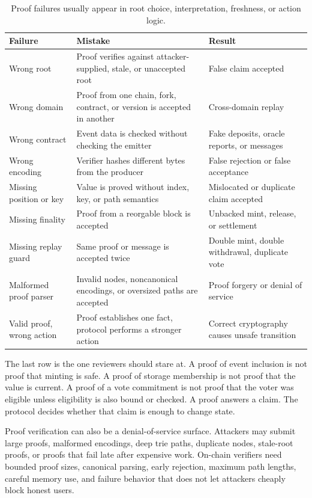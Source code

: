 \begin{table}[htbp]
\centering
\small
\renewcommand{\arraystretch}{1.18}
\begin{tabularx}{\textwidth}{@{}>{\RaggedRight\arraybackslash}p{}>{\RaggedRight\arraybackslash}p{}>{\RaggedRight\arraybackslash}X@{}}
\toprule
Failure & Mistake & Result \\
\midrule
Wrong root & Proof verifies against attacker-supplied, stale, or unaccepted root & False claim accepted \\
Wrong domain & Proof from one chain, fork, contract, or version is accepted in another & Cross-domain replay \\
Wrong contract & Event data is checked without checking the emitter & Fake deposits, oracle reports, or messages \\
Wrong encoding & Verifier hashes different bytes from the producer & False rejection or false acceptance \\
Missing position or key & Value is proved without index, key, or path semantics & Mislocated or duplicate claim accepted \\
Missing finality & Proof from a reorgable block is accepted & Unbacked mint, release, or settlement \\
Missing replay guard & Same proof or message is accepted twice & Double mint, double withdrawal, duplicate vote \\
Malformed proof parser & Invalid nodes, noncanonical encodings, or oversized paths are accepted & Proof forgery or denial of service \\
Valid proof, wrong action & Proof establishes one fact, protocol performs a stronger action & Correct cryptography causes unsafe transition \\
\bottomrule
\end{tabularx}
\caption{Proof failures usually appear in root choice, interpretation, freshness, or action logic.}
\end{table}

The last row is the one reviewers should stare at. A proof of event inclusion is not proof that minting is safe. A proof of storage membership is not proof that the value is current. A proof of a vote commitment is not proof that the voter was eligible unless eligibility is also bound or checked. A proof answers a claim. The protocol decides whether that claim is enough to change state.

Proof verification can also be a denial-of-service surface. Attackers may submit large proofs, malformed encodings, deep trie paths, duplicate nodes, stale-root proofs, or proofs that fail late after expensive work. On-chain verifiers need bounded proof sizes, canonical parsing, early rejection, maximum path lengths, careful memory use, and failure behavior that does not let attackers cheaply block honest users.

